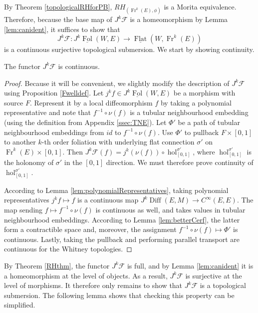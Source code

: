 \documentclass[10pt]{amsart}
\newcommand{\F}{{\mathcal{F}}}
\newcommand{\Diff}{{\operatorname{Diff}}}
\newcommand{\hol}{{\operatorname{hol}}}
\newcommand{\FolCat}{{\underline{\operatorname{Fol}}}}
\newcommand{\FlatCat}{{\underline{\operatorname{Flat}}}}
\newcommand{\Fr}{{\operatorname{Fr}}}
\numberwithin{theoremalpha}{section}
\numberwithin{equation}{section}
\numberwithin{definition}{section}
\numberwithin{theorem}{section}
\numberwithin{proposition}{section}
\numberwithin{lemma}{section}
\numberwithin{example}{section}
\numberwithin{remark}{section}
\numberwithin{corollary}{section}
\numberwithin{question}{section}
\numberwithin{problem}{section}
\numberwithin{assumption}{section}
\theoremstyle{named}
\numberwithin{equation}{section}
\begin{document}
By Theorem \ref{topologicalRHforPB}, $RH_{(\Fr^{k}(E), \phi)}$ is a Morita equivalence. Therefore, because the base map of $J^{k}\F$ is a homeomorphism by Lemma \ref{lem:canident}, it suffices to show that 
\[ J^k\F: J^{k}\FolCat(W,E) \to \FlatCat(W, \Fr^{k}(E))\]
is a continuous surjective topological submersion. We start by showing continuity. 
\begin{lemma} \label{continuityofJkF}
The functor $J^k\F$ is continuous. 
\end{lemma}
\begin{proof}
Because it will be convenient, we slightly modify the description of $J^k \F$ using Proposition \ref{Fwelldef}. Let $j^kf \in J^k\FolCat(W,E)$ be a morphism with source $F$. Represent it by a local diffeomorphism $f$ by taking a polynomial representative and note that $f^{-1}\circ \nu(f)$ is a tubular neighbourhood embedding (using the definition from Appendix \ref{ssec:TNE}). Let $\Phi'$ be a path of tubular neighbourhood embeddings from $id$ to $f^{-1}\circ \nu(f)$. Use $\Phi'$ to pullback $F \times [0,1]$ to another $k$-th order foliation with underlying flat connection $\sigma'$ on $\Fr^k(E) \times [0,1]$. Then $J^k\F(f) = j^k(\nu(f)) \circ \hol_{[0,1]}^{\sigma'}$, where $\hol_{[0,1]}^{\sigma'}$ is the holonomy of $\sigma'$ in the $[0,1]$ direction. We must therefore prove continuity of $\hol_{[0,1]}^{\sigma'}$. 

According to Lemma \ref{lem:polynomialRepresentatives}, taking polynomial representatives $j^kf \mapsto f$ is a continuous map $J^k\Diff(E,M) \rightarrow C^\infty(E,E)$. The map sending $f \mapsto f^{-1} \circ \nu(f)$ is continuous as well, and takes values in tubular neighbourhood embeddings. According to Lemma \ref{lem:betterCerf}, the latter form a contractible space and, moreover, the assignment $f^{-1} \circ \nu(f) \mapsto \Phi'$ is continuous. Lastly, taking the pullback and performing parallel transport are continuous for the Whitney topologies.
\end{proof}

By Theorem \ref{RHthm}, the functor $J^{k}\F$ is full, and by Lemma \ref{lem:canident} it is a homeomorphism at the level of objects. As a result, $J^{k}\F$ is surjective at the level of morphisms. It therefore only remains to show that $J^{k}\F$ is a topological submersion. The following lemma shows that checking this property can be simplified.
\end{document}
